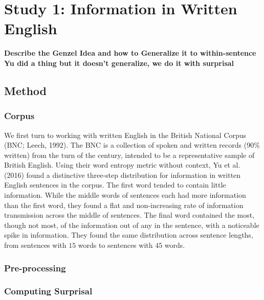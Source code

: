 \documentclass[10pt, letterpaper]{article}
\begin{document}
\hypertarget{study-1-information-in-written-english}{%
\section{Study 1: Information in Written
English}\label{study-1-information-in-written-english}}

\textbf{Describe the Genzel Idea and how to Generalize it to
within-sentence} \textbf{Yu did a thing but it doesn't generalize, we do
it with surprisal}

\hypertarget{method}{%
\subsection{Method}\label{method}}

\hypertarget{corpus}{%
\subsubsection{Corpus}\label{corpus}}

We first turn to working with written English in the British National
Corpus (BNC; Leech, 1992). The BNC is a collection of spoken and written
records (90\% written) from the turn of the century, intended to be a
representative sample of British English. Using their word entropy
metric without context, Yu et al. (2016) found a distinctive three-step
distribution for information in written English sentences in the corpus.
The first word tended to contain little information. While the middle
words of sentences each had more information than the first word, they
found a flat and non-increasing rate of information transmission across
the middle of sentences. The final word contained the most, though not
most, of the information out of any in the sentence, with a noticeable
spike in information. They found the same distribution across sentence
lengths, from sentences with \(15\) words to sentences with \(45\)
words.

\hypertarget{pre-processing}{%
\subsubsection{Pre-processing}\label{pre-processing}}

\hypertarget{computing-surprisal}{%
\subsubsection{Computing Surprisal}\label{computing-surprisal}}
\end{document}
